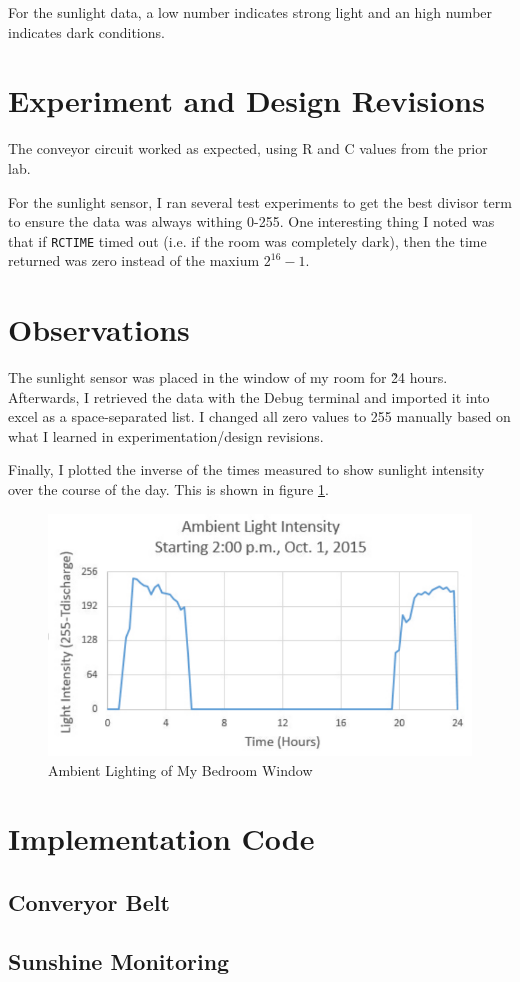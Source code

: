 \documentclass[11pt]{article}
\begin{document}
For the sunlight data, a low number indicates strong light and an
high number indicates dark conditions.

\section{Experiment and Design Revisions}

The conveyor circuit worked as expected, using R and C values from the prior lab.

For the sunlight sensor, I ran several test experiments to get the best divisor term
to ensure the data was always withing 0-255. One interesting thing I noted was
that if \texttt{RCTIME} timed out (i.e. if the room was completely dark), then
the time returned was zero instead of the maxium $2^{16}-1$.

\section{Observations}

The sunlight sensor was placed in the window of my room for \~ 24 hours.
Afterwards, I retrieved the data with the Debug terminal and imported it
into excel as a space-separated list. I changed all zero values to 255 manually
based on what I learned in experimentation/design revisions.

Finally, I plotted the inverse of the times measured to show sunlight
intensity over the course of the day. This is shown in figure \ref{ambient-lighting-results}.

\begin{figure}[h!]
\centering
\includegraphics[width=.7\textwidth]{ambient-lighting-results.pdf}
\caption{Ambient Lighting of My Bedroom Window}
\label{ambient-lighting-results}
\end{figure}

\clearpage
\section{Implementation Code}

\subsection{Converyor Belt}
\begingroup
\fontsize{10pt}{12pt}

\endgroup

\clearpage
\subsection{Sunshine Monitoring}
\begingroup
\fontsize{10pt}{12pt}

\endgroup
\end{document}
